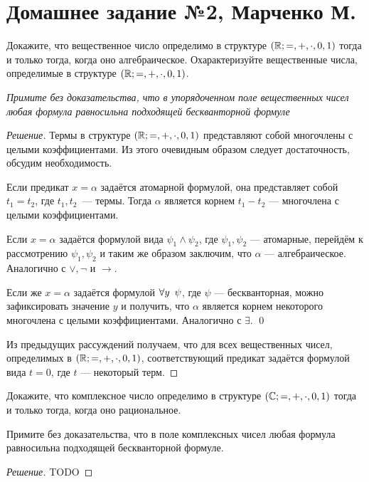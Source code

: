 


    \section*{Домашнее задание №2, Марченко М.}

    \begin{problem}[1]
        Докажите, что вещественное число определимо в структуре \((\mathbb{R}; =, +, \cdot, 0, 1)\) тогда и только тогда, когда оно алгебраическое. Охарактеризуйте вещественные числа, определимые в структуре \((\mathbb{R}; =, +, \cdot, 0, 1)\).

        {\itshape Примите без доказательства, что в упорядоченном поле вещественных чисел любая формула равносильна подходящей бескванторной формуле}
    \end{problem}
    \begin{proof}[Решение]
        Термы в структуре \((\mathbb{R}; =, +, \cdot, 0, 1)\) представляют собой многочлены с целыми коэффициентами. Из этого очевидным образом следует достаточность, обсудим необходимость.
        
        Если предикат \(x = \alpha\) задаётся атомарной формулой, она представляет собой \(t_1 = t_2\), где \(t_1, t_2\)~--- термы. Тогда \(\alpha\) является корнем \(t_1 - t_2\) --- многочлена с целыми коэффициентами.
        
        Если \(x = \alpha\) задаётся формулой вида \(\psi_1 \land \psi_2\), где \(\psi_1, \psi_2\) --- атомарные, перейдём к рассмотрению \(\psi_1, \psi_2\) и таким же образом заключим, что \(\alpha\) --- алгебраическое. Аналогично с \(\lor, \lnot\) и \(\to\).

        Если же \(x = \alpha\) задаётся формулой \(\forall y \enskip \psi\), где \(\psi\) --- бескванторная, можно зафиксировать значение \(y\) и получить, что \(\alpha\) является корнем некоторого многочлена с целыми коэффициентами. Аналогично с \(\exists\). \qed

        Из предыдущих рассуждений получаем, что для всех вещественных чисел, определимых в \((\mathbb{R}; =, +, \cdot, 0, 1)\), соответствующий предикат задаётся формулой вида \(t = 0\), где \(t\) --- некоторый терм.
    \end{proof}

    \begin{problem}[2]
        Докажите, что комплексное число определимо в структуре \((\mathbb{C}; =, +, \cdot, 0, 1)\) тогда и только тогда, когда оно рациональное.

        Примите без доказательства, что в поле комплексных чисел любая формула равносильна подходящей бескванторной формуле.
    \end{problem}
    \begin{proof}[Решение]
        TODO
    \end{proof}

